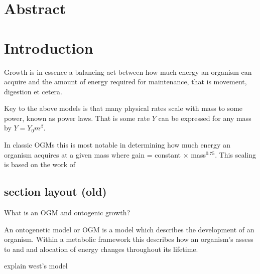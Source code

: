 \documentclass[a4paper, hidelinks]{article} %
\begin{document}
	

	\section*{Abstract}
	\linenumbers

	
	
	\nolinenumbers
	
	
	\tableofcontents
	\newpage


\section{Introduction}
	\linenumbers
	
	Growth is in essence a balancing act between how much energy an organism can acquire and the amount of energy required for maintenance, that is movement, digestion et cetera.  
	
	
	Key to the above models is that many physical rates %
	scale with mass to some power, known as power laws.  That is some rate $Y$ can be expressed for any mass by $Y = Y_0 m^\beta$.  
	
	
	In classic OGMs this is most notable in determining how much energy an organism acquires at a given mass where gain = constant $\times$ mass$^{0.75}$.  This scaling is based on the work of \cite{West1997} \cite{Allen2005}
	
	
\subsection{section layout (old)}
	What is an OGM and ontogenic growth?
	
	An ontogenetic model or OGM is a model which describes the development of an organism.  Within a metabolic framework this describes how an organism's assess to and and alocation of energy changes throughout its lifetime.
	
	explain west's model
	
\end{document}
